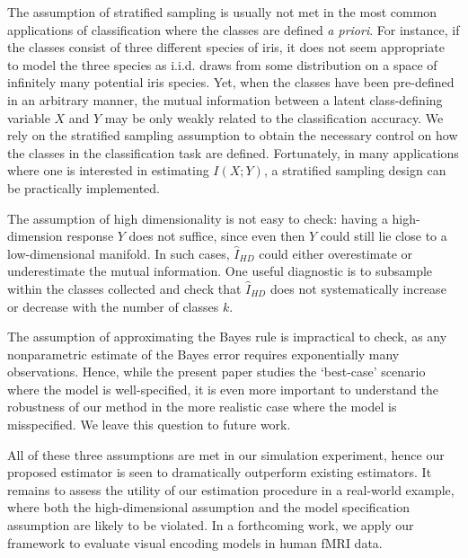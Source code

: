 \documentclass{article}
\begin{document}
The assumption of stratified sampling is usually not met in the most common applications of classification
where the classes are defined \emph{a priori}.  For instance, if the classes consist of three different species of iris,
it does not seem appropriate to model the three species as i.i.d. draws from some distribution on a space of infinitely many
potential iris species.  Yet, when the classes have been pre-defined in an arbitrary manner,
the mutual information between a latent class-defining variable $X$ and $Y$ may be only weakly related to the classification
accuracy.  We rely on the stratified sampling assumption to obtain the necessary control on how the classes
in the classification task are defined.  Fortunately, in many applications where one is interested in estimating $I(X; Y)$,
a stratified sampling design can be practically implemented.

The assumption of high dimensionality is not easy to check:
having a high-dimension response $Y$ does not suffice, since even then $Y$ could still
lie close to a low-dimensional manifold.  In such cases, $\hat{I}_{HD}$ could either overestimate or underestimate the mutual information.
One useful diagnostic is to subsample within the classes collected
and check that $\hat{I}_{HD}$ does not systematically increase or decrease with the number of classes $k$.

The assumption of approximating the Bayes rule is impractical to check, 
as any nonparametric estimate of the Bayes error requires exponentially many observations.
Hence, while the present paper studies the `best-case' scenario where the model is well-specified,
it is even more important to understand the robustness of our method in the more realistic case
where the model is misspecified.  We leave this question to future work.


All of these three assumptions are met in our simulation experiment, 
hence our proposed estimator is seen to dramatically outperform existing estimators. It remains to assess the utility
of our estimation procedure in a real-world example, where both the high-dimensional assumption and the model specification assumption are likely to be violated.  In a forthcoming
work, we apply our framework to evaluate visual encoding models in
human fMRI data.
\end{document}
